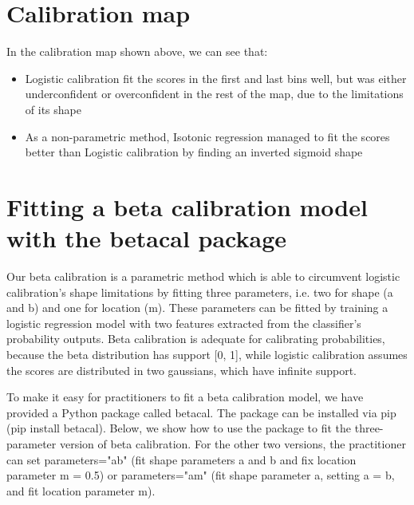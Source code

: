 \documentclass[oneside]{article}\usepackage[]{graphicx}\usepackage[]{color}
\begin{document}
\clearpage

\section*{Calibration map}
In the calibration map shown above, we can see that:

\begin{itemize}
    \item Logistic calibration fit the scores in the first and last bins well, but was either underconfident or overconfident in the rest of the map, due to the limitations of its shape
    \item As a non-parametric method, Isotonic regression managed to fit the scores better than Logistic calibration by finding an inverted sigmoid shape
\end{itemize}

\section*{Fitting a beta calibration model with the betacal package}

Our beta calibration is a parametric method which is able to circumvent logistic calibration's shape limitations by fitting three parameters, i.e. two for shape (a and b) and one for location (m). These parameters can be fitted by training a logistic regression model with two features extracted from the classifier's probability outputs. Beta calibration is adequate for calibrating probabilities, because the beta distribution has support [0, 1], while logistic calibration assumes the scores are distributed in two gaussians, which have infinite support.

To make it easy for practitioners to fit a beta calibration model, we have provided a Python package called betacal. The package can be installed via pip (pip install betacal). Below, we show how to use the package to fit the three-parameter version of beta calibration. For the other two versions, the practitioner can set parameters="ab" (fit shape parameters a and b and fix location parameter m = 0.5) or parameters="am" (fit shape parameter a, setting a = b, and fit location parameter m).
\end{document}
